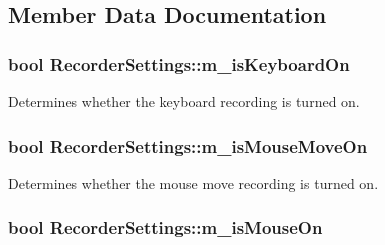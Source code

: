 \subsection{Member Data Documentation}
\hypertarget{class_recorder_settings_ae0def32c58f09b7bee960fe1ce8e9aaa}{
\subsubsection[{m\-\_\-is\-Keyboard\-On}]{\setlength{\rightskip}{0pt plus 5cm}bool Recorder\-Settings\-::m\-\_\-is\-Keyboard\-On\hspace{0.3cm}{\ttfamily [private]}}}\label{class_recorder_settings_ae0def32c58f09b7bee960fe1ce8e9aaa}


Determines whether the keyboard recording is turned on. 

\hypertarget{class_recorder_settings_a28a563230501520415b36633749276d1}{
\subsubsection[{m\-\_\-is\-Mouse\-Move\-On}]{\setlength{\rightskip}{0pt plus 5cm}bool Recorder\-Settings\-::m\-\_\-is\-Mouse\-Move\-On\hspace{0.3cm}{\ttfamily [private]}}}\label{class_recorder_settings_a28a563230501520415b36633749276d1}


Determines whether the mouse move recording is turned on. 

\hypertarget{class_recorder_settings_a746410b0e99f530247dd7146a70e53c4}{
\subsubsection[{m\-\_\-is\-Mouse\-On}]{\setlength{\rightskip}{0pt plus 5cm}bool Recorder\-Settings\-::m\-\_\-is\-Mouse\-On\hspace{0.3cm}{\ttfamily [private]}}}\label{class_recorder_settings_a746410b0e99f530247dd7146a70e53c4}


